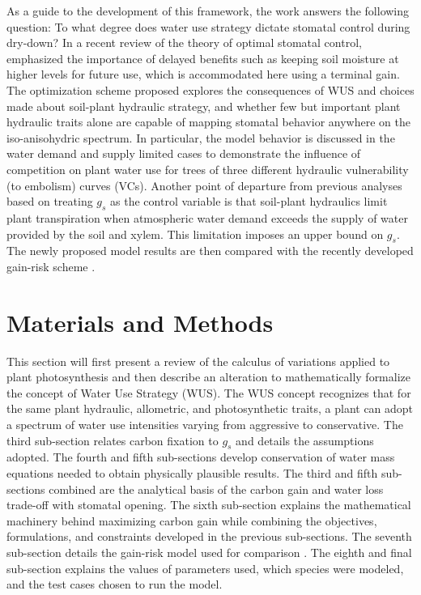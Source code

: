 \documentclass[utf8]{frontiersSCNS} %
\begin{document}
As a guide to the development of this framework, the work answers the following question: To what degree does water use strategy dictate stomatal control during dry-down? In a recent review of the theory of optimal stomatal control, \citet{buckley_optimal_2017} emphasized the importance of delayed benefits such as keeping soil moisture at higher levels for future use, which is accommodated here using a terminal gain. The optimization scheme proposed explores the consequences of WUS and choices made about soil-plant hydraulic strategy, and whether few but important plant hydraulic traits alone are capable of mapping stomatal behavior anywhere on the iso-anisohydric spectrum. In particular, the model behavior is discussed in the water demand and supply limited cases to demonstrate the influence of competition on plant water use for trees of three different hydraulic vulnerability (to embolism)  curves (VCs). Another point of departure from previous analyses based on treating $g_s$ as the control variable is that soil-plant hydraulics limit plant transpiration when atmospheric water demand exceeds the supply of water provided by the soil and xylem. This limitation imposes an upper bound on $g_s$. The newly proposed model results are then compared with the recently developed gain-risk scheme \citep{venturas_2018}. 

\section{Materials and Methods}

This section will first present a review of the calculus of variations applied to plant photosynthesis and then describe an alteration to mathematically formalize the concept of Water Use Strategy (WUS). The WUS concept recognizes that for the same plant hydraulic, allometric, and photosynthetic traits, a plant can adopt a spectrum of water use intensities varying from aggressive to conservative. The third sub-section relates carbon fixation to $g_s$ and details the assumptions adopted. The fourth and fifth sub-sections develop conservation of water mass equations needed to obtain physically plausible results. The third and fifth sub-sections combined are the analytical basis of the carbon gain and water loss trade-off with stomatal opening. The sixth sub-section explains the mathematical machinery behind maximizing carbon gain while combining the objectives, formulations, and constraints developed in the previous sub-sections. The seventh sub-section details the gain-risk model used for comparison \citep{sperry_what_2015,sperry_pragmatic_2016}. The eighth and final sub-section explains the values of parameters used, which species were modeled, and the test cases chosen to run the model.
\end{document}

